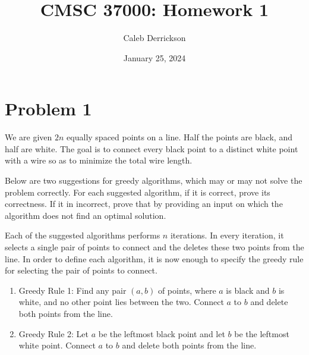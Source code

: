 

\title{CMSC 37000: Homework 1}
\author{Caleb Derrickson}
\date{January 25, 2024}


\onehalfspacing
\maketitle
\allowdisplaybreaks

\tableofcontents

\newpage
\section{Problem 1}
We are given $2n$ equally spaced points on a line. Half the points are black, and half are white. The goal is to connect every black point to a distinct white point with a wire so as to minimize the total wire length. \par
Below are two suggestions for greedy algorithms, which may or may not solve the problem correctly. For each suggested algorithm, if it is correct, prove its correctness. If it in incorrect, prove that by providing an input on which the algorithm does not find an optimal solution. \par
Each of the suggested algorithms performs $n$ iterations. In every iteration, it selects a single pair of points to connect and the deletes these two points from the line. In order to define each algorithm, it is now enough to specify the greedy rule for selecting the pair of points to connect.
\begin{enumerate}
    \item Greedy Rule 1: Find any pair $(a, b)$ of points, where $a$ is black and $b$ is white, and no other point lies between the two. Connect $a$ to $b$ and delete both points from the line.
    \item Greedy Rule 2: Let $a$ be the leftmost black point and let $b$ be the leftmost white point. Connect $a$ to $b$ and delete both points from the line. 
\end{enumerate}
\newpage
